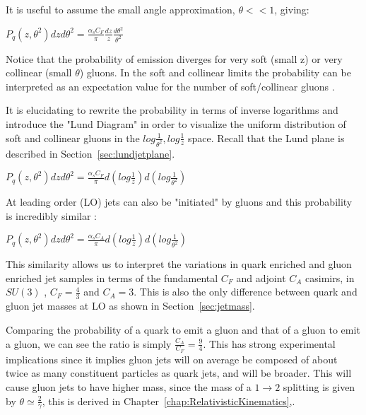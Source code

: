 It is useful to assume the small angle approximation, $\theta << 1$, giving:\newline


$P_q(z,\theta^2) dz d \theta^2 = \frac{\alpha_s C_F}{\pi}  \frac{dz}{z} \frac{d \theta^2}{ \theta^2}  $\newline

Notice that the probability of emission diverges for very soft (small z) or very collinear (small $\theta$) gluons. In the soft and collinear limits the probability can be interpreted as an expectation value for the number of soft/collinear gluons \cite{Larkoski:2017fip}.

It is elucidating to rewrite the probability in terms of inverse logarithms and introduce the "Lund Diagram" in order to visualize the uniform distribution of soft and collinear gluons in the $log \frac{1}{ \theta^2} , log\frac{1}{z} $ space. Recall that the Lund plane is described in Section~\ref{sec:lundjetplane}.




$P_q(z,\theta^2) dz d \theta^2 = \frac{\alpha_s C_F}{\pi} d( log\frac{1}{z}  ) d(log \frac{1}{ \theta^2})  $\newline

At leading order (LO) jets can also be "initiated" by gluons and this probability is incredibly similar :


$P_q(z,\theta^2) dz d \theta^2 = \frac{\alpha_s C_A}{\pi} d( log\frac{1}{z}  ) d(log \frac{1}{ \theta^2})  $\newline


This similarity allows us to interpret the variations in quark enriched and gluon enriched jet samples in terms of the fundamental $C_F$ and adjoint $C_A$ casimirs, in $SU(3)$ ,   $C_F = \frac{4}{3}$ and $C_A=3$. This is also the only difference between quark and gluon jet masses at LO as shown in Section~\ref{sec:jetmass}.


Comparing the probability of a quark to emit a gluon and that of a gluon to emit a gluon, we can see the ratio is simply $\frac{C_A}{C_F} =\frac{9}{4} $. This has strong experimental implications since it implies gluon jets will on average be composed of about twice as many constituent particles as quark jets, and will be broader. This will cause gluon jets to have higher mass, since the mass of a $1 \rightarrow 2 $ splitting is given by $\theta \simeq \frac{2}{\gamma} $, this is derived in Chapter~\ref{chap:RelativisticKinematics},.




